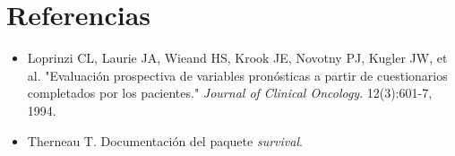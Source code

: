 \documentclass[a4paper,12pt]{article}
\begin{document}
	\section*{Referencias}
	\begin{itemize}
		\item Loprinzi CL, Laurie JA, Wieand HS, Krook JE, Novotny PJ, Kugler JW, et al. "Evaluación prospectiva de variables pronósticas a partir de cuestionarios completados por los pacientes." \textit{Journal of Clinical Oncology}. 12(3):601-7, 1994.
		\item Therneau T. Documentación del paquete \textit{survival}.
	\end{itemize}
	
\end{document}
